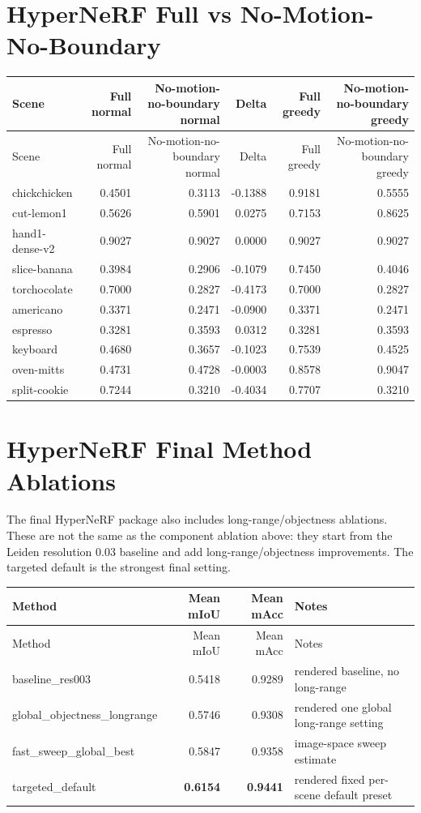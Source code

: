 \documentclass[10pt]{article}
\begin{document}
\section{HyperNeRF Full vs No-Motion-No-Boundary}
\small
\begin{longtable}{lrrrrr}
\toprule
Scene & Full normal & No-motion-no-boundary normal & Delta & Full greedy & No-motion-no-boundary greedy \\
\midrule
\endfirsthead
\toprule
Scene & Full normal & No-motion-no-boundary normal & Delta & Full greedy & No-motion-no-boundary greedy \\
\midrule
\endhead
chickchicken & 0.4501 & 0.3113 & -0.1388 & 0.9181 & 0.5555 \\
cut-lemon1 & 0.5626 & 0.5901 & 0.0275 & 0.7153 & 0.8625 \\
hand1-dense-v2 & 0.9027 & 0.9027 & 0.0000 & 0.9027 & 0.9027 \\
slice-banana & 0.3984 & 0.2906 & -0.1079 & 0.7450 & 0.4046 \\
torchocolate & 0.7000 & 0.2827 & -0.4173 & 0.7000 & 0.2827 \\
americano & 0.3371 & 0.2471 & -0.0900 & 0.3371 & 0.2471 \\
espresso & 0.3281 & 0.3593 & 0.0312 & 0.3281 & 0.3593 \\
keyboard & 0.4680 & 0.3657 & -0.1023 & 0.7539 & 0.4525 \\
oven-mitts & 0.4731 & 0.4728 & -0.0003 & 0.8578 & 0.9047 \\
split-cookie & 0.7244 & 0.3210 & -0.4034 & 0.7707 & 0.3210 \\
\bottomrule
\end{longtable}
\normalsize

\section{HyperNeRF Final Method Ablations}
The final HyperNeRF package also includes long-range/objectness ablations.  These are not the same as the component ablation above: they start from the Leiden resolution 0.03 baseline and add long-range/objectness improvements.  The targeted default is the strongest final setting.

\small
\begin{longtable}{lrrp{6.5cm}}
\toprule
Method & Mean mIoU & Mean mAcc & Notes \\
\midrule
\endfirsthead
\toprule
Method & Mean mIoU & Mean mAcc & Notes \\
\midrule
\endhead
baseline\_res003 & 0.5418 & 0.9289 & rendered baseline, no long-range \\
global\_objectness\_longrange & 0.5746 & 0.9308 & rendered one global long-range setting \\
fast\_sweep\_global\_best & 0.5847 & 0.9358 & image-space sweep estimate \\
targeted\_default & \textbf{0.6154} & \textbf{0.9441} & rendered fixed per-scene default preset \\
\bottomrule
\end{longtable}
\normalsize
\end{document}
